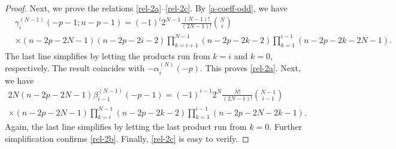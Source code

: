 \documentclass[a4paper,12pt,reqno]{amsart}
\numberwithin{theorem}{subsection}
\numberwithin{equation}{section}
\begin{document}
\begin{proof}
Next, we prove the relations \eqref{rel-2a}--\eqref{rel-2c}. By
\eqref{a-coeff-odd}, we have
\begin{align*}
& \gamma_i^{(N-1)}(-p\!-\!1;n\!-\!p\!-\!1) = (-1)^{i} 2^{N-1} \frac{(N\!-\!1)!}{(2N\!-\!1)!} \binom{N}{i} \\
& \times (n\!-\!2p\!-\!2N\!-\!1)(n\!-\!2p\!-\!2i\!-\!2) \prod_{k=i+1}^{N-1}
(n\!-\!2p\!-\!2k\!-\!2) \prod_{k=1}^{i-1}(n\!-\!2p\!-\!2k\!-\!2N\!-\!1).
\end{align*}
The last line simplifies by letting the products run from $k=i$ and $k=0$,
respectively. The result coincides with $-\alpha_i^{(N)}(-p)$. This proves
\eqref{rel-2a}. Next, we have
\begin{multline*}
   2N (n\!-\!2p\!-\!2N\!-\!1) \beta_{i-1}^{(N-1)}(-p\!-\!1) = (-1)^{i-1} 2^N \frac{N!}{(2N\!-\!1)!}
   \binom{N-1}{i-1} \\ \times (n\!-\!2p\!-\!2N\!-\!1) \prod_{k=i}^{N-1}
   (n\!-\!2p\!-\!2k\!-\!2) \prod_{k=1}^{i-1} (n\!-\!2p\!-\!2N\!-\!2k\!-\!1).
\end{multline*}
Again, the last line simplifies by letting the last product run from $k=0$.
Further simplification confirms \eqref{rel-2b}. Finally, \eqref{rel-2c} is easy
to verify.


\end{proof}
\end{document}

